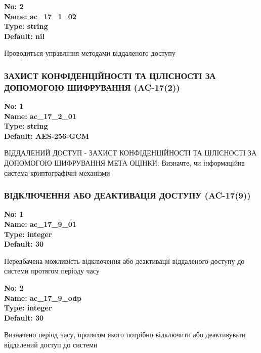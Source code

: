\documentclass{article}
\begin{document}
{\footnotesize\bfseries
No: 2\\
Name: ac\_\allowbreak{}17\_\allowbreak{}1\_\allowbreak{}02\\
Type: string\\
Default: nil
}

{\footnotesize Проводиться управління методами віддаленого доступу}




\subsubsection{ЗАХИСТ КОНФІДЕНЦІЙНОСТІ ТА ЦІЛІСНОСТІ ЗА ДОПОМОГОЮ ШИФРУВАННЯ (AC-17(2))}


\vspace{10pt}
{\footnotesize\bfseries
No: 1\\
Name: ac\_\allowbreak{}17\_\allowbreak{}2\_\allowbreak{}01\\
Type: string\\
Default: \textquotedbl{}AES-256-GCM\textquotedbl{}
}

{\footnotesize ВІДДАЛЕНИЙ ДОСТУП - ЗАХИСТ КОНФІДЕНЦІЙНОСТІ ТА ЦІЛІСНОСТІ ЗА ДОПОМОГОЮ ШИФРУВАННЯ МЕТА ОЦІНКИ: Визначте, чи інформаційна система криптографічні механізми}




\subsubsection{ВІДКЛЮЧЕННЯ АБО ДЕАКТИВАЦІЯ ДОСТУПУ (AC-17(9))}


\vspace{10pt}
{\footnotesize\bfseries
No: 1\\
Name: ac\_\allowbreak{}17\_\allowbreak{}9\_\allowbreak{}01\\
Type: integer\\
Default: 30
}

{\footnotesize Передбачена можливість відключення або деактивації віддаленого доступу до системи протягом періоду часу}


{\footnotesize\bfseries
No: 2\\
Name: ac\_\allowbreak{}17\_\allowbreak{}9\_\allowbreak{}odp\\
Type: integer\\
Default: 30
}

{\footnotesize Визначено період часу, протягом якого потрібно відключити або деактивувати віддалений доступ до системи}
\end{document}
